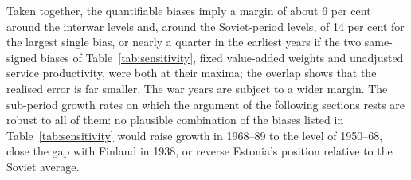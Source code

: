 Taken together, the quantifiable biases imply a margin of about 6 per cent around the interwar levels and, around the Soviet-period levels, of 14 per cent for the largest single bias, or nearly a quarter in the earliest years if the two same-signed biases of Table~\ref{tab:sensitivity}, fixed value-added weights and unadjusted service productivity, were both at their maxima; the overlap shows that the realised error is far smaller. The war years are subject to a wider margin. The sub-period growth rates on which the argument of the following sections rests are robust to all of them: no plausible combination of the biases listed in Table~\ref{tab:sensitivity} would raise growth in 1968--89 to the level of 1950--68, close the gap with Finland in 1938, or reverse Estonia's position relative to the Soviet average.

